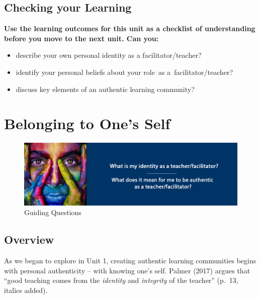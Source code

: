 \documentclass[
]{book}
\providecommand{\tightlist}{%
  \setlength{\itemsep}{0pt}\setlength{\parskip}{0pt}}
\begin{document}
\hypertarget{checking-your-learning}{%
\section*{Checking your Learning}\label{checking-your-learning}}

\begin{progress}
\textbf{Use the learning outcomes for this unit as a checklist of
understanding before you move to the next unit. Can you:}

\begin{itemize}
\tightlist
\item
  describe your own personal identity as a facilitator/teacher?
\item
  identify your personal beliefs about your role~as
  a~facilitator/teacher?
\item
  discuss key elements of an authentic learning community?
\end{itemize}
\end{progress}

\hypertarget{belonging-to-ones-self}{%
\chapter{Belonging to One's Self}\label{belonging-to-ones-self}}

\begin{figure}
\centering
\includegraphics{assets/unit2/LDRS664-BannerUnit2-v3.jpg}
\caption{Guiding Questions}
\end{figure}

\hypertarget{overview-1}{%
\section*{Overview}\label{overview-1}}

As we began to explore in Unit 1, creating authentic learning communities begins with personal authenticity -- with knowing one's self. Palmer (2017) argues that ``good teaching comes from the \emph{identity} and \emph{integrity} of the teacher'' (p.~13, italics added).
\end{document}
